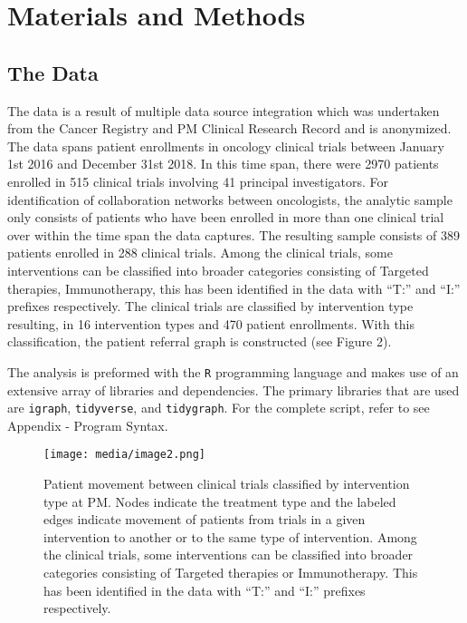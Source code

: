 \documentclass{article}
\begin{document}
\section{Materials and Methods}\label{materials-and-methods}

\subsection{The Data}\label{the-data}

The data is a result of multiple data source integration which was
undertaken from the Cancer Registry and PM Clinical Research Record and
is anonymized. The data spans patient enrollments in oncology clinical
trials between January 1st 2016 and December 31st 2018. In this time
span, there were 2970 patients enrolled in 515 clinical trials involving
41 principal investigators. For identification of collaboration networks
between oncologists, the analytic sample only consists of patients who
have been enrolled in more than one clinical trial over within the time
span the data captures. The resulting sample consists of 389 patients
enrolled in 288 clinical trials. Among the clinical trials, some
interventions can be classified into broader categories consisting of
Targeted therapies, Immunotherapy, this has been identified in the data
with ``T:'' and ``I:'' prefixes respectively. The clinical trials are
classified by intervention type resulting, in 16 intervention types and
470 patient enrollments. With this classification, the patient referral
graph is constructed (see Figure 2).

The analysis is preformed with the \texttt{R} programming language and
makes use of an extensive array of libraries and dependencies. The
primary libraries that are used are \texttt{igraph}, \texttt{tidyverse},
and \texttt{tidygraph}. For the complete script, refer to see Appendix -
Program Syntax.
\begin{figure}
\centering
\texttt{[image: media/image2.png]}
\caption{Patient movement between clinical trials classified
by intervention type at PM. Nodes indicate the treatment type and the
labeled edges indicate movement of patients from trials in a given
intervention to another or to the same type of intervention. Among the
clinical trials, some interventions can be classified into broader
categories consisting of Targeted therapies or Immunotherapy. This has
been identified in the data with ``T:'' and ``I:'' prefixes
respectively.}
\end{figure}
\end{document}
